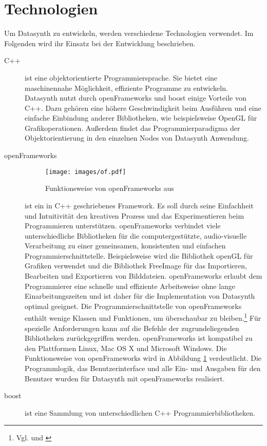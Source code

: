\documentclass[a4paper, 
               12pt,
               DIV=calc,
               version=first,
               pdftex,
               headsepline,
               footsepline,
               bibtotocnumbered,
               liststotocnumbered]{scrreprt}
\begin{document}
\section{Technologien}
\label{sec:Technologien}
Um Datasynth zu entwickeln, werden verschiedene Technologien verwendet.
Im Folgenden wird ihr Einsatz bei der Entwicklung beschrieben.
\begin{description}
\item[C++]
ist eine objektorientierte Programmiersprache. Sie bietet
eine maschinennahe Möglichkeit, effiziente Programme zu entwickeln.
Datasynth nutzt durch openFrameworks und boost einige Vorteile
von C++. Dazu gehören eine höhere Geschwindigkeit beim Ausführen
und eine einfache Einbindung anderer Bibliotheken, wie 
beispielsweise OpenGL für Grafikoperationen. Außerdem
findet das Programmierparadigma der Objektorientierung
in den einzelnen Nodes von Datasynth Anwendung.
\item[openFrameworks]
\begin{figure}
\centering
\texttt{[image: images/of.pdf]}
\caption{Funktionsweise von openFrameworks aus \citep{of_wiki}}
\label{fig:of}
\end{figure}
ist ein in C++ geschriebenes Framework. Es soll durch seine
Einfachheit und Intuitivität den kreativen Prozess und das
Experimentieren beim Programmieren unterstützen. openFrameworks
verbindet viele unterschiedliche Bibliotheken für die
computergestützte, audio-visuelle Verarbeitung zu einer gemeinsamen,
konsistenten und einfachen Programmierschnittstelle. Beispielsweise
wird die Bibliothek openGL für Grafiken verwendet und die
Bibliothek FreeImage für das Importieren, Bearbeiten und Exportieren von Bilddateien.
openFrameworks erlaubt dem Programmierer eine schnelle und effiziente Arbeitsweise ohne
lange Einarbeitungszeiten und ist daher für die Implementation von Datasynth optimal geeignet.
Die Programmierschnittstelle von openFrameworks enthält
wenige Klassen und Funktionen, um überschaubar zu bleiben.\footnote{Vgl. \citep{of1} und \citep{of2}}
Für spezielle Anforderungen kann auf die Befehle der zugrundeliegenden Bibliotheken
zurückgegriffen werden.
openFrameworks ist kompatibel zu den Plattformen
Linux, Mac OS X und Microsoft Windows.
Die Funktionsweise von openFrameworks wird in Abbildung
\ref{fig:of} verdeutlicht. 
Die Programmlogik, das Benutzerinterface und alle Ein- und
Ausgaben für den Benutzer wurden für Datasynth mit openFrameworks
realisiert.
\item[boost]
ist eine Sammlung von unterschiedlichen C++ Programmierbibliotheken.

\end{description}
\end{document}
